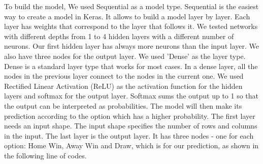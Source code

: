 To build the model, We used Sequential as a model type. Sequential is the easiest way to create a model in Keras. It allows to build a model layer by layer. Each layer has weights that correspond to the layer that follows it. \newline \newline %
We tested networks with different depths from 1 to 4 hidden layers with a different number of neurons. Our first hidden layer has always more neurons than the input layer. We also have three nodes for the output layer.\newline \newline
We used 'Dense' as the layer type. Dense is a standard layer type that works for most cases. In a dense layer, all the nodes in the previous layer connect to the nodes in the current one.\newline \newline
We used Rectified Linear Activation (ReLU) as the activation function for the hidden layers and softmax for the output layer. Softmax sums the output up to 1 so that the output can be interpreted as probabilities. The model will then make its prediction according to the option which has a higher probability.\newline \newline
The first layer needs an input shape. The input shape specifies the number of rows and columns in the input.\newline
The last layer is the output layer. It has three nodes - one for each option: Home Win, Away Win and Draw, which is for our prediction, as shown in the following line of codes.\newline

